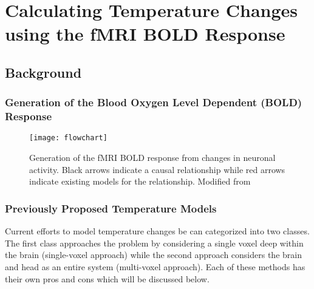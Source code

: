 \chapter{Calculating Temperature Changes using the fMRI BOLD Response}

\section{Background}
  \subsection{Generation of the {B}lood {O}xygen {L}evel {D}ependent ({BOLD}) Response}
    \begin{figure}
      \begin{center}
        \texttt{[image: flowchart]}
        \caption[Generation of the fMRI BOLD Response]{\label{fig:flowchart} Generation of the fMRI BOLD response from changes in neuronal activity.  Black arrows indicate a causal relationship while red arrows indicate existing models for the relationship.  Modified from~\citet{sotero2007}}
      \end{center}
    \end{figure}
    
  \subsection{Previously Proposed Temperature Models}
  Current efforts to model temperature changes be can categorized into two classes.  The first class approaches the problem by considering a single voxel deep within the brain (single-voxel approach) while the second approach considers the brain and head as an entire system (multi-voxel approach).  Each of these methods has their own pros and cons which will be discussed below.
